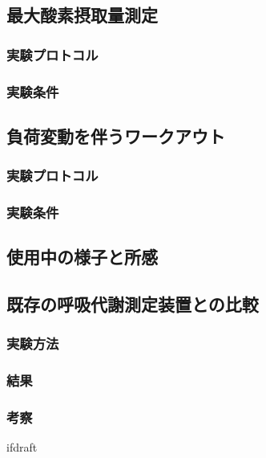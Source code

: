 \subsection{最大酸素摂取量測定}

\subsubsection{実験プロトコル}

\subsubsection{実験条件}

\subsection{負荷変動を伴うワークアウト}

\subsubsection{実験プロトコル}

\subsubsection{実験条件}

\subsection{使用中の様子と所感}

\subsection{既存の呼吸代謝測定装置との比較}

\subsubsection{実験方法}

\subsubsection{結果}

\subsubsection{考察}

\expandafter\ifx\csname ifdraft\endcsname\relax
  
\fi
